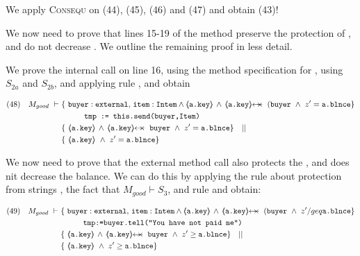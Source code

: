 \begin{proofO}
We apply {\textsc{Consequ}} on (44), (45), (46) and (47) and obtain (43)!

\normalsize


 We now need to prove that lines 15-19 of the method preserve the protection of , and do not decrease .
 We outline the  remaining proof in less detail.
 
 We prove the internal call on line 16, using the method specification for , using $S_{2a}$ and $S_{2b}$, and applying rule {}, and obtain

 \small
\begin{align*}
\text{(48)} \ \ \ M_{good}\  \vdash \ & \{ \ \prg{buyer}:\prg{external},\, \prg{item}:\prg{Intem} \wedge {\inside{\prg{a.key}}} \, \wedge\, 
\protectedFrom {\prg{a.key}} {(\prg{buyer}}  \  \wedge\ z'= \prg{a.\balance}  \} \\
		  		& \SPT  \prg{tmp := this.send(buyer,Item)}\ \\  
		  		& \{ \ \inside{\prg{a.key}} \, \wedge\, 
\protectedFrom {\prg{a.key}} {\prg{buyer}} \ \wedge\ z'= \prg{a.\balance}  \} \ \ \  || \ \ \  \\
		  		&   \{ \   {\inside{\prg{a.key}}}\  \wedge\ z'= \prg{a.\balance}  \}
\end{align*}
\normalsize  
 

We now need to prove that the external method call  also protects the , and does nit decrease the balance. We can do this by applying the rule about protection from strings  {}, the fact that $M_{good} \vdash S_{3}$, and rule  {} and obtain:


 \small
\begin{align*}
\text{(49)} \ \ \ M_{good}\  \vdash \ & \{ \ \prg{buyer}:\prg{external},\, \prg{item}:\prg{Intem} \wedge {\inside{\prg{a.key}}} \, \wedge\, 
\protectedFrom {\prg{a.key}} {(\prg{buyer}}  \  \wedge\ z'/geq  \prg{a.\balance}  \} \\
		  		& \SPT  \prg{tmp:=buyer.tell("You have not paid me")}\ \\  
		  		& \{ \ \inside{\prg{a.key}} \, \wedge\, 
\protectedFrom {\prg{a.key}} {\prg{buyer}} \ \wedge\ z'\geq \prg{a.\balance}  \} \ \ \  || \ \ \  \\
		  		&   \{ \   {\inside{\prg{a.key}}}\  \wedge\ z'\geq  \prg{a.\balance}  \}
\end{align*}
\normalsize 


\end{proofO}
